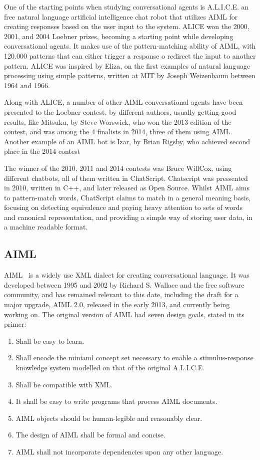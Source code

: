 One of the starting points when studying conversational agents is A.L.I.C.E. an free natural language artificial intelligence chat robot that utilizes AIML for creating responses based on the user input to the system. ALICE won the 2000, 2001, and 2004 Loebner prizes, becoming a starting point while developing conversational agents. It makes use of the pattern-matching ability of AIML, with 120.000 patterns that can either trigger a response o redirect the input to another pattern. ALICE was inspired by Eliza, on the first examples of natural language processing using simple patterns, written at MIT by Joseph Weizenbaum between 1964 and 1966.

Along with ALICE, a number of other AIML conversational agents have been presented to the Loebner contest, by different authors, usually getting good results, like Mitsuku, by Steve Worswick, who won the 2013 edition of the contest, and was among the 4 finalists in 2014, three of them using AIML. Another example of an AIML bot is Izar, by Brian Rigsby, who achieved second place in the 2014 contest

The winner of the 2010, 2011 and 2014 contests was Bruce WillCox, using different chatbots, all of them written in ChatScript. Chatscript was pressented in 2010, written in C++, and later released as Open Source. Whilst AIML aims to pattern-match words, ChatScript claims to match in a general meaning basis, focusing on detecting equivalence and paying heavy attention to sets of words and canonical representation, and providing a simple way of storing user data, in a machine readable format.

\subsection{\ac{AIML}}

\ac{AIML}~\cite{aimlprimer} is a widely use XML dialect for creating conversational language. It was developed between 1995 and 2002 by Richard S. Wallace and the free software community, and has remained relevant to this date, including the draft for a major upgrade, AIML 2.0, released in the early 2013, and currently being working on. The original version of AIML had seven design goals, stated in its primer:
\begin{enumerate}[topsep=0pt,itemsep=-1ex,partopsep=1ex,parsep=1ex]
  \item Shall be easy to learn.
  \item Shall encode the miniaml concept set necessary to enable a stimulus-response knowledge system modelled on that of the original A.L.I.C.E.
  \item Shall be compatible with XML.
  \item It shall be easy to write programs that process AIML documents.
  \item \ac{AIML} objects should be human-legible and reasonably clear.
  \item The design of \ac{AIML} shall be formal and concise.
  \item \ac{AIML} shall not incorporate dependencies upon any other language.
\end{enumerate}


